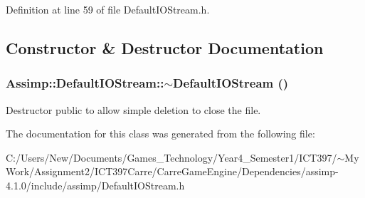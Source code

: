 Definition at line 59 of file DefaultIOStream.h.

\subsection{Constructor \& Destructor Documentation}
\hypertarget{class_assimp_1_1_default_i_o_stream_d21769a2e865f8522ba2ebd97b75beda}{
\subsubsection[$\sim$DefaultIOStream]{\setlength{\rightskip}{0pt plus 5cm}Assimp::DefaultIOStream::$\sim$DefaultIOStream ()}}
\label{class_assimp_1_1_default_i_o_stream_d21769a2e865f8522ba2ebd97b75beda}


Destructor public to allow simple deletion to close the file. 

The documentation for this class was generated from the following file:\begin{CompactItemize}
\item 
C:/Users/New/Documents/Games\_\-Technology/Year4\_\-Semester1/ICT397/$\sim$My Work/Assignment2/ICT397Carre/CarreGameEngine/Dependencies/assimp-4.1.0/include/assimp/DefaultIOStream.h\end{CompactItemize}
